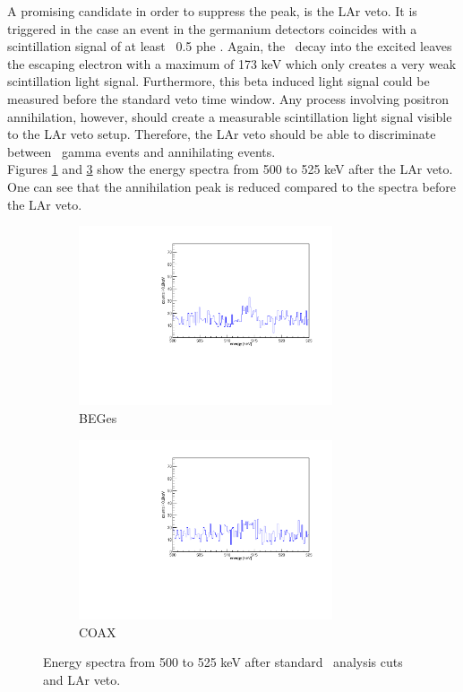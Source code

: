 \documentclass[encoding=utf8,british]{tumphthesis}
\begin{document}
A promising candidate in order to suppress the peak, is the LAr veto.
It is triggered in the case an event in the germanium detectors coincides with a scintillation signal of at least ~0.5 phe \cite{agostini_background_2017}.
Again, the \Kr\ decay into the excited  leaves the escaping electron with a maximum of 173 keV which only creates a very weak scintillation light signal.
Furthermore, this beta induced light signal could be measured before the standard veto time window.
Any process involving positron annihilation, however, should create a measurable scintillation light signal visible to the LAr veto setup.
Therefore, the LAr veto should be able to discriminate between \Kr\ gamma events and annihilating events.
\\

Figures \ref{fig:LArBEGes} and \ref{fig:LArCOAX} show the energy spectra from 500 to 525 keV after the LAr veto.
One can see that the annihilation peak is reduced compared to the spectra before the LAr veto.
\\

\begin{figure}[t!]
\centering
\begin{subfigure}{0.475\textwidth}
	\includegraphics[width=75mm]{./Bilder/500525LArVetoBEGes.pdf}
    \caption{BEGes}
  \label{fig:LArBEGes}
\end{subfigure}\hfill%
\begin{subfigure}{0.475\textwidth}
	\includegraphics[width=75mm]{./Bilder/500525LArVetoCOAX.pdf}
  \caption{COAX}
  \label{fig:LArCOAX}
\end{subfigure}
    \caption{Energy spectra from 500 to 525 keV after standard \gerda\ analysis cuts and LAr veto.}
\end{figure}
\end{document}
